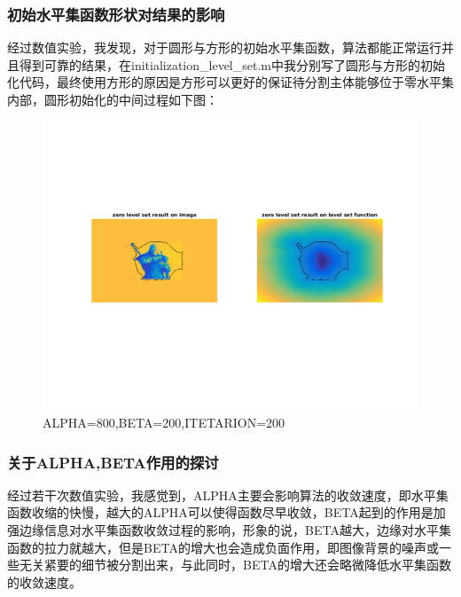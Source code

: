 \documentclass[a4paper, UTF8]{ctexrep}
\begin{document}
		\subsubsection{初始水平集函数形状对结果的影响} %
		\label{ssub:初始水平集函数形状对结果的影响}
			经过数值实验，我发现，对于圆形与方形的初始水平集函数，算法都能正常运行并且得到可靠的结果，在initialization\_level\_set.m中我分别写了圆形与方形的初始化代码，最终使用方形的原因是方形可以更好的保证待分割主体能够位于零水平集内部，圆形初始化的中间过程如下图：
			\begin{figure}[htbp!]
				\centering
				\includegraphics[width=\textwidth]{hw3_fig10.png}
				\caption{ALPHA=800,BETA=200,ITETARION=200}
				\label{fig:figure1}
			\end{figure}
			\clearpage
		\subsubsection{关于ALPHA,BETA作用的探讨} %
		\label{ssub:关于_}
			经过若干次数值实验，我感觉到，ALPHA主要会影响算法的收敛速度，即水平集函数收缩的快慢，越大的ALPHA可以使得函数尽早收敛，BETA起到的作用是加强边缘信息对水平集函数收敛过程的影响，形象的说，BETA越大，边缘对水平集函数的拉力就越大，但是BETA的增大也会造成负面作用，即图像背景的噪声或一些无关紧要的细节被分割出来，与此同时，BETA的增大还会略微降低水平集函数的收敛速度。
\end{document}
